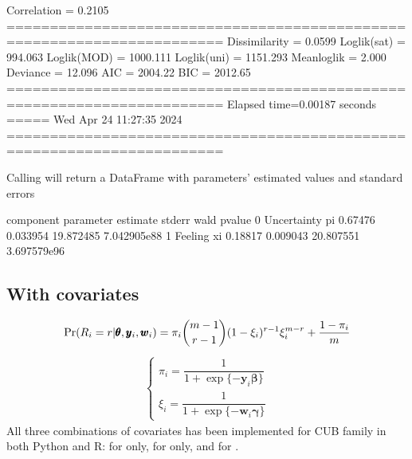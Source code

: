 \documentclass[letterpaper,10pt,english]{sphinxmanual}
\begin{document}
\begin{sphinxVerbatim}[commandchars=\\\{\}]
Correlation   = 0.2105
=======================================================================
Dissimilarity = 0.0599
Loglik(sat)   = \PYGZhy{}994.063
Loglik(MOD)   = \PYGZhy{}1000.111
Loglik(uni)   = \PYGZhy{}1151.293
Mean\PYGZhy{}loglik   = \PYGZhy{}2.000
Deviance      = 12.096
\PYGZhy{}\PYGZhy{}\PYGZhy{}\PYGZhy{}\PYGZhy{}\PYGZhy{}\PYGZhy{}\PYGZhy{}\PYGZhy{}\PYGZhy{}\PYGZhy{}\PYGZhy{}\PYGZhy{}\PYGZhy{}\PYGZhy{}\PYGZhy{}\PYGZhy{}\PYGZhy{}\PYGZhy{}\PYGZhy{}\PYGZhy{}\PYGZhy{}\PYGZhy{}\PYGZhy{}\PYGZhy{}\PYGZhy{}\PYGZhy{}\PYGZhy{}\PYGZhy{}\PYGZhy{}\PYGZhy{}\PYGZhy{}\PYGZhy{}\PYGZhy{}\PYGZhy{}\PYGZhy{}\PYGZhy{}\PYGZhy{}\PYGZhy{}\PYGZhy{}\PYGZhy{}\PYGZhy{}\PYGZhy{}\PYGZhy{}\PYGZhy{}\PYGZhy{}\PYGZhy{}\PYGZhy{}\PYGZhy{}\PYGZhy{}\PYGZhy{}\PYGZhy{}\PYGZhy{}\PYGZhy{}\PYGZhy{}\PYGZhy{}\PYGZhy{}\PYGZhy{}\PYGZhy{}\PYGZhy{}\PYGZhy{}\PYGZhy{}\PYGZhy{}\PYGZhy{}\PYGZhy{}\PYGZhy{}\PYGZhy{}\PYGZhy{}\PYGZhy{}\PYGZhy{}\PYGZhy{}
AIC = 2004.22
BIC = 2012.65
=======================================================================
Elapsed time=0.00187 seconds =====\PYGZgt{}\PYGZgt{}\PYGZgt{} Wed Apr 24 11:27:35 2024
=======================================================================
\end{sphinxVerbatim}

\noindent{}

\sphinxAtStartPar
Calling  will return a DataFrame with
parameters’ estimated values and standard errors

\begin{sphinxVerbatim}[commandchars=\\\{\}]
     component parameter  estimate    stderr       wald        pvalue
0  Uncertainty        pi   0.67476  0.033954  19.872485  7.042905e\PYGZhy{}88
1      Feeling        xi   0.18817  0.009043  20.807551  3.697579e\PYGZhy{}96
\end{sphinxVerbatim}


\subsection{With covariates}
\label{\detokenize{manual:with-covariates}}\begin{equation*}
\begin{split}\Pr(R_i=r|\pmb\theta, \pmb y_i, \pmb w_i) = \pi_i \dbinom{m-1}{r-1}(1-\xi_i)^{r-1}\xi_i^{m-r}+\dfrac{1-\pi_i}{m}\end{split}
\end{equation*}\begin{equation*}
\begin{split}\left\{
\begin{array}{l}
    \pi_i = \dfrac{1}{1+\exp\{-\pmb y_i \pmb \beta\}}
    \\
    \xi_i = \dfrac{1}{1+\exp\{-\pmb w_i \pmb \gamma\}}
\end{array}
\right.\end{split}
\end{equation*}
\sphinxAtStartPar
All three combinations of covariates has been implemented for CUB family in both Python and R:
for  only, for  only, and for .
\end{document}
